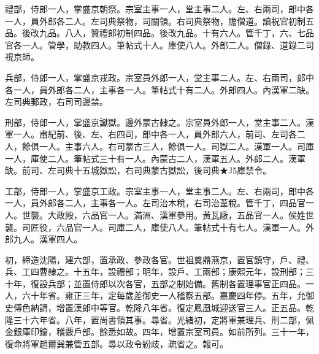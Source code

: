 \begin{pinyinscope}
禮部，侍郎一人，掌盛京朝祭。宗室主事一人，堂主事二人。左、右兩司，郎中各一人，員外郎各二人。左司典祭物，司關領。右司典祭物，贍僧道。讀祝官初制五品。後改九品。八人，贊禮郎初制四品。後改九品。十有六人。管千丁，六、七品官各一人。管學，助教四人。筆帖式十人。庫使八人。外郎二人。僧錄、道錄二司視京師。

兵部，侍郎一人，掌盛京戎政。宗室員外郎一人，堂主事二人。左、右兩司，郎中各一人，員外郎各二人，主事各一人。筆帖式十有二人。外郎四人。內漢軍二缺。左司典郵政，右司司邊禁。

刑部，侍郎一人，掌盛京讞獄。邊外蒙古隸之。宗室員外郎一人，堂主事二人。漢軍一人。肅紀前、後、左、右四司，郎中各一人，員外郎六人，前司、左司各二人，餘俱一人。主事六人。右司蒙古三人，餘俱一人。司獄二人。漢軍一人。司庫一人，庫使二人。筆帖式三十有一人。內蒙古二人，漢軍五人。外郎二人。漢軍缺。前司、左司典十五城獄訟，右司典蒙古獄訟，後司典★J5庫禁令。

工部，侍郎一人，掌盛京工政。宗室主事一人，堂主事二人。左、右兩司，郎中各一人，員外郎各二人，主事各一人。左司治木稅，右司治葦稅。管千丁，四品官一人。世襲。大政殿，六品官一人。滿洲、漢軍參用。黃瓦廠，五品官一人。侯姓世襲。司匠役，六品官一人。司庫二人，庫使八人。筆帖式十有七人。漢軍一人。外郎九人。漢軍四人。

初，締造沈陽，建六部，置承政、參政各官。世祖奠鼎燕京，置官鎮守，戶、禮、兵、工四曹隸之。十五年，設禮部；明年，設戶、工兩部；康熙元年，設刑部；三十年，復設兵部；並置侍郎以次各官，五部之制始備。舊制各置理事官正四品。一人，六十年省。雍正三年，定每歲差御史一人稽察五部。嘉慶四年停。五年，允御史傅色納請，增置漢郎中等官。乾隆八年省。復定鳳凰城迎送官三人。正五品。乾隆三十六年省。八年，置尚書領其事。尋省。光緒初，定將軍兼理兵、刑二部，佩金銀庫印鑰，稽覈戶部。餘悉如故。四年，增置宗室司員。如前所列。三十一年，復命將軍趙爾巽兼管五部。尋以政令紛歧，疏省之。報可。


\end{pinyinscope}